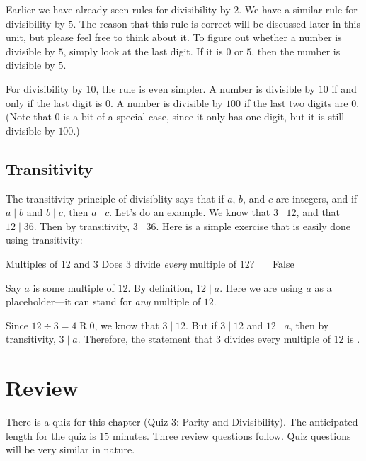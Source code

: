 \documentclass[a4paper,10pt]{report}
\begin{document}
Earlier we have already seen rules for divisibility by \(2\). We have a similar
rule for divisibility by \(5\). The reason that this rule is correct will be
discussed later in this unit, but please feel free to think about it. To figure
out whether a number is divisible by \(5\), simply look at the last digit. If
it is \(0\) or \(5\), then the number is divisible by \(5\).

For divisibility by \(10\), the rule is even simpler. A number is divisible by
\(10\) if and only if the last digit is \(0\). A number is divisible by \(100\)
if the last two digits are \(0\). (Note that \(0\) is a bit of a special case,
since it only has one digit, but it is still divisible by \(100\).)

\subsection{Transitivity}

The \gls{transitivity} principle of divisiblity says that if \(a\), \(b\), and
\(c\) are integers, and if \(a \mid b\) and \(b \mid c\), then \(a \mid c\).
Let's do an example. We know that \(3 \mid 12\), and that \(12 \mid 36\). Then
by transitivity, \(3 \mid 36\). Here is a simple exercise that is easily done
using transitivity:

\begin{problem}{Multiples of \(12\) and \(3\)}
 Does \(3\) divide \emph{every} multiple of \(12\)? \hfill {}~~~False

 \begin{solution}
  Say \(a\) is some multiple of \(12\). By definition, \(12 \mid a\). Here we
  are using \(a\) as a placeholder---it can stand for \emph{any} multiple of
  \(12\).

  Since \(12 \div 3 = 4 \operatorname{R} 0\), we know that \(3 \mid 12\). But
  if \(3 \mid 12\) and \(12 \mid a\), then by transitivity, \(3 \mid a\).
  Therefore, the statement that \(3\) divides every multiple of \(12\) is
  .
 \end{solution}
\end{problem}

\section{Review}

There is a quiz for this chapter (Quiz 3: Parity and Divisibility). The
anticipated length for the quiz is \(15\) minutes. Three review questions
follow. Quiz questions will be very similar in nature.
\end{document}
